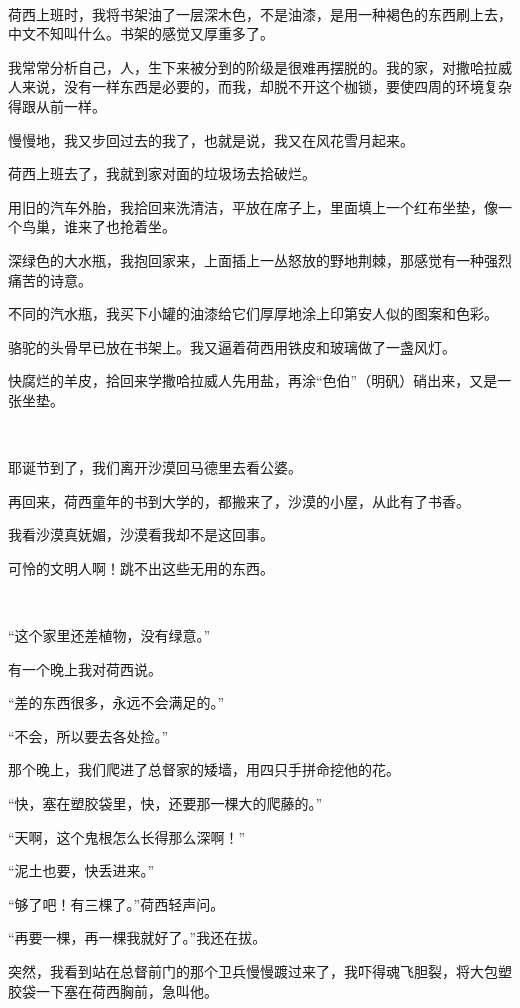 \par  
\par 荷西上班时，我将书架油了一层深木色，不是油漆，是用一种褐色的东西刷上去，中文不知叫什么。书架的感觉又厚重多了。
\par 我常常分析自己，人，生下来被分到的阶级是很难再摆脱的。我的家，对撒哈拉威人来说，没有一样东西是必要的，而我，却脱不开这个枷锁，要使四周的环境复杂得跟从前一样。
\par 慢慢地，我又步回过去的我了，也就是说，我又在风花雪月起来。
\par 荷西上班去了，我就到家对面的垃圾场去拾破烂。
\par 用旧的汽车外胎，我拾回来洗清洁，平放在席子上，里面填上一个红布坐垫，像一个鸟巢，谁来了也抢着坐。
\par 深绿色的大水瓶，我抱回家来，上面插上一丛怒放的野地荆棘，那感觉有一种强烈痛苦的诗意。
\par 不同的汽水瓶，我买下小罐的油漆给它们厚厚地涂上印第安人似的图案和色彩。
\par 骆驼的头骨早已放在书架上。我又逼着荷西用铁皮和玻璃做了一盏风灯。
\par 快腐烂的羊皮，拾回来学撒哈拉威人先用盐，再涂“色伯”（明矾）硝出来，又是一张坐垫。
\par  
\par 耶诞节到了，我们离开沙漠回马德里去看公婆。
\par 再回来，荷西童年的书到大学的，都搬来了，沙漠的小屋，从此有了书香。
\par 我看沙漠真妩媚，沙漠看我却不是这回事。
\par 可怜的文明人啊！跳不出这些无用的东西。
\par  
\par “这个家里还差植物，没有绿意。”
\par 有一个晚上我对荷西说。
\par “差的东西很多，永远不会满足的。”
\par “不会，所以要去各处捡。”
\par 那个晚上，我们爬进了总督家的矮墙，用四只手拼命挖他的花。
\par “快，塞在塑胶袋里，快，还要那一棵大的爬藤的。”
\par “天啊，这个鬼根怎么长得那么深啊！”
\par “泥土也要，快丢进来。”
\par “够了吧！有三棵了。”荷西轻声问。
\par “再要一棵，再一棵我就好了。”我还在拔。
\par 突然，我看到站在总督前门的那个卫兵慢慢踱过来了，我吓得魂飞胆裂，将大包塑胶袋一下塞在荷西胸前，急叫他。
